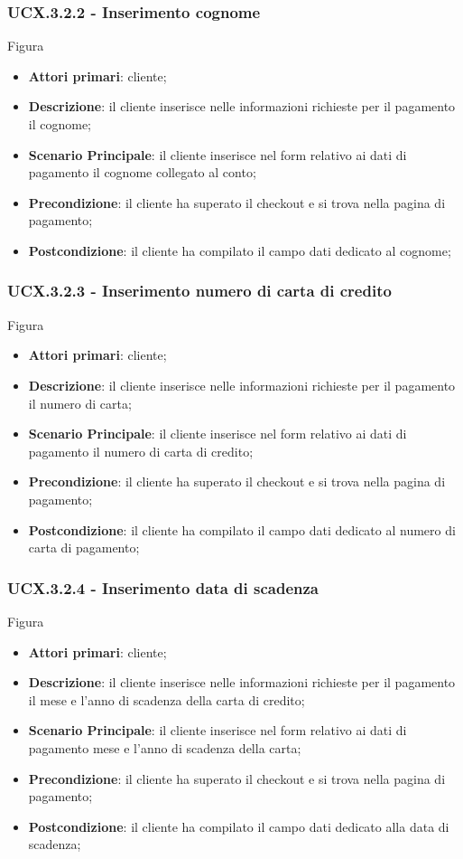 \subsubsection{UCX.3.2.2 - Inserimento cognome}
Figura \\
\begin{itemize}
\item \textbf{Attori primari}: cliente;
\item \textbf{Descrizione}: il cliente inserisce nelle informazioni richieste per il pagamento il cognome;
\item \textbf{Scenario Principale}: il cliente inserisce nel form relativo ai dati di pagamento il cognome collegato al conto;
\item \textbf{Precondizione}: il cliente ha superato il checkout e si trova nella pagina di pagamento;
\item \textbf{Postcondizione}: il cliente ha compilato il campo dati dedicato al cognome;
\end{itemize}

\subsubsection{UCX.3.2.3 - Inserimento numero di carta di credito}
Figura \\
\begin{itemize}
\item \textbf{Attori primari}: cliente;
\item \textbf{Descrizione}: il cliente inserisce nelle informazioni richieste per il pagamento il numero di carta;
\item \textbf{Scenario Principale}: il cliente inserisce nel form relativo ai dati di pagamento il numero di carta di credito;
\item \textbf{Precondizione}: il cliente ha superato il checkout e si trova nella pagina di pagamento;
\item \textbf{Postcondizione}: il cliente ha compilato il campo dati dedicato al numero di carta di pagamento;
\end{itemize}

\subsubsection{UCX.3.2.4 - Inserimento data di scadenza}
Figura \\
\begin{itemize}
\item \textbf{Attori primari}: cliente;
\item \textbf{Descrizione}: il cliente inserisce nelle informazioni richieste per il pagamento il mese e l'anno di scadenza della carta di credito;
\item \textbf{Scenario Principale}: il cliente inserisce nel form relativo ai dati di pagamento mese e l'anno di scadenza della carta;
\item \textbf{Precondizione}: il cliente ha superato il checkout e si trova nella pagina di pagamento;
\item \textbf{Postcondizione}: il cliente ha compilato il campo dati dedicato alla data di scadenza;
\end{itemize}

